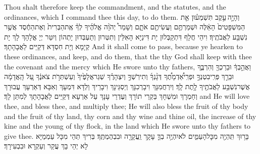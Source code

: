 {Thou shalt therefore keep the commandment, and the statutes, and the ordinances, which I command thee this day, to do them.}{}
{וְהָיָ֣ה \legarmeh  עֵ֣קֶב תִּשְׁמְע֗וּן אֵ֤ת הַמִּשְׁפָּטִים֙ הָאֵ֔לֶּה וּשְׁמַרְתֶּ֥ם וַעֲשִׂיתֶ֖ם אֹתָ֑ם וְשָׁמַר֩ יְהֹוָ֨ה אֱלֹהֶ֜יךָ לְךָ֗ אֶֽת\maqqaf הַבְּרִית֙ וְאֶת\maqqaf הַחֶ֔סֶד אֲשֶׁ֥ר נִשְׁבַּ֖ע לַאֲבֹתֶֽיךָ׃}
{וִיהֵי חֲלָף דִּתְקַבְּלוּן יָת דִּינַיָּא הָאִלֵּין וְתִטְּרוּן וְתַעְבְּדוּן יָתְהוֹן וְיִטַּר יְיָ אֱלָהָךְ לָךְ יָת קְיָמָא וְיָת חִסְדָּא דְּקַיֵּים לַאֲבָהָתָךְ׃}
{And it shall come to pass, because ye hearken to these ordinances, and keep, and do them, that the \lord\space thy God shall keep with thee the covenant and the mercy which He swore unto thy fathers,}{}
{וַאֲהֵ֣בְךָ֔ וּבֵרַכְךָ֖ וְהִרְבֶּ֑ךָ וּבֵרַ֣ךְ פְּרִֽי\maqqaf בִטְנְךָ֣ וּפְרִֽי\maqqaf אַ֠דְמָתֶ֠ךָ דְּגָ֨נְךָ֜ וְתִירֹֽשְׁךָ֣ וְיִצְהָרֶ֗ךָ שְׁגַר\maqqaf אֲלָפֶ֙יךָ֙ וְעַשְׁתְּרֹ֣ת צֹאנֶ֔ךָ עַ֚ל הָֽאֲדָמָ֔ה אֲשֶׁר\maqqaf נִשְׁבַּ֥ע לַאֲבֹתֶ֖יךָ לָ֥תֶת לָֽךְ׃}
{וְיִרְחֲמִנָּךְ וִיבָרְכִנָּךְ וְיַסְגֵּינָךְ וִיבָרֵיךְ וַלְדָּא דִּמְעָךְ וְאִבָּא דְּאַרְעָךְ עֲבוּרָךְ וְחַמְרָךְ וּמִשְׁחָךְ בַּקְרֵי תוֹרָךְ וְעֶדְרֵי עָנָךְ עַל אַרְעָא דְּקַיֵּים לַאֲבָהָתָךְ לְמִתַּן לָךְ׃}
{and He will love thee, and bless thee, and multiply thee; He will also bless the fruit of thy body and the fruit of thy land, thy corn and thy wine and thine oil, the increase of thy kine and the young of thy flock, in the land which He swore unto thy fathers to give thee.}{}
{בָּר֥וּךְ תִּֽהְיֶ֖ה מִכׇּל\maqqaf הָעַמִּ֑ים לֹא\maqqaf יִהְיֶ֥ה בְךָ֛ עָקָ֥ר וַֽעֲקָרָ֖ה וּבִבְהֶמְתֶּֽךָ׃}
{בְּרִיךְ תְּהֵי מִכָּל עַמְמַיָּא לָא יְהֵי בָךְ עֲקַר וְעַקְרָא וּבִבְעִירָךְ׃}
